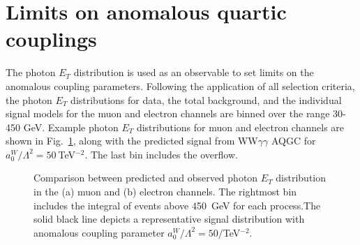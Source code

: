 \section{Limits on anomalous quartic couplings} %
\label{sec:limits_pT}

The photon $E_T$ distribution is used as an observable to set limits on
the anomalous coupling parameters. Following the application
of all selection criteria, the photon $E_T$ distributions for data, the total background, and the individual signal models
for the muon and electron channels are binned over the range 30-450 GeV. Example photon $E_T$ distributions for muon and electron 
channels are shown in Fig.~\ref{photonplots}, along with the predicted signal from
WW$\gamma\gamma$ AQGC for $a_{0}^{W}/\Lambda^{2} = 50~$TeV$^{-2}$. The last bin includes the overflow.

\begin{figure}[htb]
   \begin{center}
   \caption{Comparison between predicted and observed photon $E_T$
distribution in the (a) muon and (b) electron channels. The rightmost bin
includes the integral of events above 450~GeV for each process.The solid black
line depicts a representative signal distribution with anomalous coupling parameter
$a_{0}^{W}/\Lambda^{2} = 50/$TeV$^{-2}$. }
\label{photonplots}
\end{center}
\end{figure}

